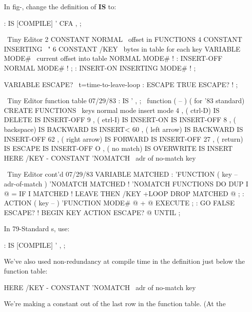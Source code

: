 In fig-\Forth{}, change the definition of \textbf{IS} to:

\begin{Code}
: IS   [COMPILE] '  CFA , ;
\end{Code}
\begin{figure*}[tttt]
\setcounter{screen}{30}
\begin{Screen}
\ Tiny Editor
2 CONSTANT NORMAL     \ offset in FUNCTIONS
4 CONSTANT INSERTING  \        "
6 CONSTANT /KEY       \ bytes in table for each key
VARIABLE MODE#        \ current offset into table
NORMAL MODE# !
: INSERT-OFF   NORMAL    MODE# ! ;
: INSERT-ON    INSERTING MODE# ! ;

VARIABLE ESCAPE?      \ t=time-to-leave-loop
: ESCAPE  TRUE ESCAPE? ! ;
\end{Screen}
\begin{Screen}
\ Tiny Editor             function table             07/29/83
: IS   ' , ;  \   function   ( -- )    ( for '83 standard)
CREATE FUNCTIONS
\ keys                  normal mode        insert mode
 4 ,  ( ctrl-D)         IS DELETE          IS INSERT-OFF
 9 ,  ( etrl-I)         IS INSERT-ON       IS INSERT-OFF
 8 ,  ( backspace)      IS BACKWARD        IS INSERT<
60 ,  ( left arrow)     IS BACKWARD        IS INSERT-OFF
62 ,  ( right arrow)    IS FORWARD         IS INSERT-OFF
27 ,  ( return)         IS ESCAPE          IS INSERT-OFF
 O ,  ( no match)       IS OVERWRITE       IS INSERT
HERE /KEY -  CONSTANT 'NOMATCH  \ adr of no-match key
\end{Screen}
\begin{Screen}
\ Tiny Editor cont'd                                 07/29/83
VARIABLE MATCHED
: 'FUNCTION  ( key -- adr-of-match )  'NOMATCH  MATCHED !
   'NOMATCH FUNCTIONS DO  DUP  I @ =  IF
     I MATCHED !  LEAVE  THEN  /KEY +LOOP  DROP
    MATCHED @ ;
: ACTION  ( key -- )  'FUNCTION  MODE# @ +  @ EXECUTE ;
: GO   FALSE ESCAPE? !  BEGIN  KEY ACTION  ESCAPE? @ UNTIL ;
\end{Screen}
\end{figure*}
In 79-Standard \Forth{}s, use:
\begin{Code}
: IS   [COMPILE] '  , ;
\end{Code}
We've also used non-redundancy at compile time in the definition just
below the function table:
\begin{Code}
HERE /KEY -  CONSTANT 'NOMATCH  \  adr of no-match key
\end{Code}
We're making a constant out of the last row in the function table. (At the
